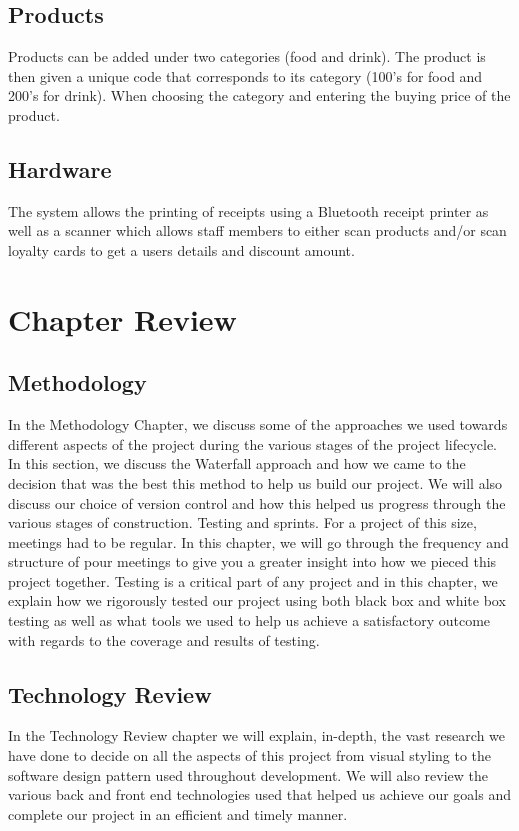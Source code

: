 \subsection{Products}
Products can be added under two categories (food and drink). The product is then given a unique code that corresponds to its category (100’s for food and 200’s for drink). When choosing the category and entering the buying price of the product.

\subsection{Hardware}
The system allows the printing of receipts using a Bluetooth receipt printer as well as a scanner which allows staff members to either scan products and/or scan loyalty cards to get a users details and discount amount.\newpage

\section{Chapter Review}
\subsection{Methodology}
In the Methodology Chapter, we discuss some of the approaches we used towards different aspects of the project during the various stages of the project lifecycle. In this section, we discuss the Waterfall approach and how we came to the decision that was the best this method to help us build our project. We will also discuss our choice of version control and how this helped us progress through the various stages of construction. Testing and sprints.
For a project of this size, meetings had to be regular. In this chapter, we will go through the frequency and structure of pour meetings to give you a greater insight into how we pieced this project together.
Testing is a critical part of any project and in this chapter, we explain how we rigorously tested our project using both black box and white box testing as well as what tools we used to help us achieve a satisfactory outcome with regards to the coverage and results of testing.

\subsection{Technology Review}
In the Technology Review chapter we will explain, in-depth, the vast research we have done to decide on all the aspects of this project from visual styling to the software design pattern used throughout development. We will also review the various back and front end technologies used that helped us achieve our goals and complete our project in an efficient and timely manner.

